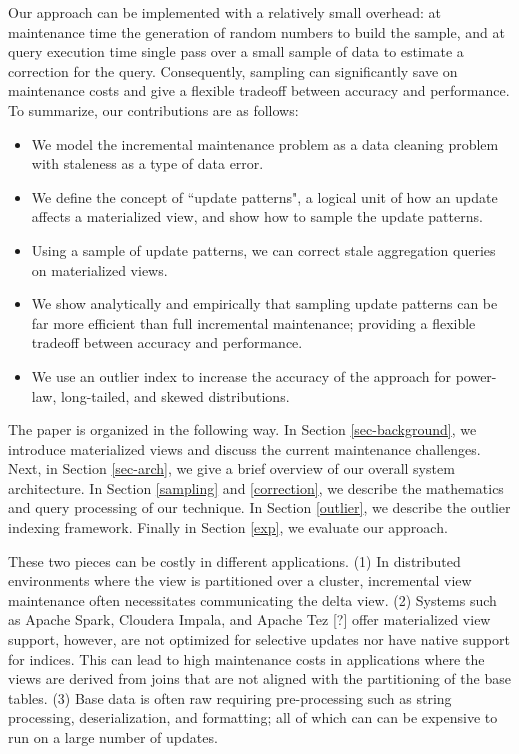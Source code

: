 Our approach can be implemented with a relatively small overhead: at maintenance time the generation of random numbers to build the sample, and at query execution time single pass over a small sample of data to estimate a correction for the query.
Consequently, sampling can significantly save on maintenance costs and give a flexible tradeoff between accuracy and performance.
To summarize, our contributions are as follows:
\begin{itemize}
  \item We model the incremental maintenance problem as a data cleaning problem with staleness as a type of data error.
  \item We define the concept of ``update patterns", a logical unit of how an update affects a materialized view, and show how to sample the update patterns.
  \item Using a sample of update patterns, we can correct stale aggregation queries on materialized views.
  \item We show analytically and empirically that sampling update patterns can be far more efficient than full incremental maintenance; providing a flexible tradeoff between accuracy and performance.
  \item We use an outlier index to increase the accuracy of the approach for power-law, long-tailed, and skewed distributions.
\end{itemize}

The paper is organized in the following way. 
In Section \ref{sec-background}, we introduce materialized views and discuss the current maintenance challenges.
Next, in Section \ref{sec-arch}, we give a brief overview of our overall system architecture.
In Section \ref{sampling} and \ref{correction}, we describe the mathematics and query processing of our technique.
In Section \ref{outlier}, we describe the outlier indexing framework.
Finally in Section \ref{exp}, we evaluate our approach.

\iffalse
 These two pieces can be costly in different
applications. (1) In distributed environments where the view is partitioned
over a cluster, incremental view maintenance often necessitates communicating
the delta view. (2) Systems such as Apache Spark, Cloudera Impala,
and Apache Tez {[}?{]} offer materialized view support, however, are
not optimized for selective updates nor have native support for indices.
This can lead to high maintenance costs in applications where the
views are derived from joins that are not aligned with the partitioning
of the base tables. (3) Base data is often raw requiring pre-processing
such as string processing, deserialization, and formatting; all of
which can can be expensive to run on a large number of updates. 



